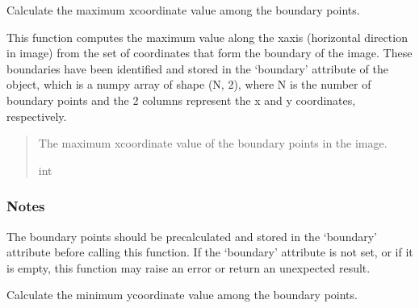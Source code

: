 \documentclass[letterpaper,10pt,english]{sphinxmanual}
\begin{document}
\begin{fulllineitems}
\begin{fulllineitems}
\end{fulllineitems}


\begin{fulllineitems}
\label{\detokenize{forensicfit.core.tape:forensicfit.core.tape.TapeAnalyzer.x_interval}}
\pysigstartsignatures
{}
\pysigstopsignatures
\sphinxAtStartPar
Calculate the maximum x\sphinxhyphen{}coordinate value among the boundary points.

\sphinxAtStartPar
This function computes the maximum value along the x\sphinxhyphen{}axis (horizontal direction in image)
from the set of coordinates that form the boundary of the image. These boundaries have been
identified and stored in the ‘boundary’ attribute of the object, which is a numpy array of
shape (N, 2), where N is the number of boundary points and the 2 columns represent the x
and y coordinates, respectively.
\begin{quote}\begin{description}
\sphinxAtStartPar
The maximum x\sphinxhyphen{}coordinate value of the boundary points in the image.

\sphinxAtStartPar
int

\end{description}\end{quote}
\subsubsection*{Notes}

\sphinxAtStartPar
The boundary points should be pre\sphinxhyphen{}calculated and stored in the ‘boundary’ attribute before
calling this function. If the ‘boundary’ attribute is not set, or if it is empty,
this function may raise an error or return an unexpected result.

\end{fulllineitems}


\begin{fulllineitems}
\label{\detokenize{forensicfit.core.tape:forensicfit.core.tape.TapeAnalyzer.ymin}}
\pysigstartsignatures
{}
\pysigstopsignatures
\sphinxAtStartPar
Calculate the minimum y\sphinxhyphen{}coordinate value among the boundary points.


\end{fulllineitems}
\end{fulllineitems}
\end{document}
